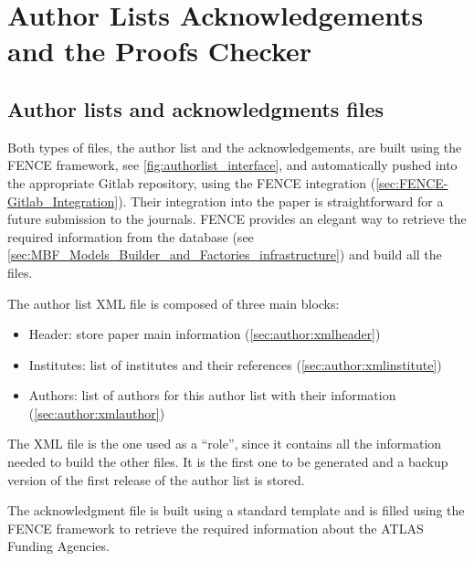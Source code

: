 
\section{Author Lists Acknowledgements and the Proofs Checker}%
\label{sec:Authorlists_Acknowledgements_and_ProofChecker}

\subsection{Author lists and acknowledgments files}%
\label{sec:Author_lists_and_acknowledgments_files}

Both types of files, the author list and the acknowledgements, are built using the FENCE framework, see \cref{fig:authorlist_interface},
and automatically pushed into the appropriate Gitlab repository, using the FENCE \gitlab integration (\cref{sec:FENCE-Gitlab_Integration}).
Their integration into the paper is straightforward for a future submission to the journals.
FENCE provides an elegant way to retrieve the required information from the database (see \cref{sec:MBF_Models_Builder_and_Factories_infrastructure}) and build all the files.
 
The author list XML file is composed of three main blocks:
\begin{itemize}
\item Header: store paper main information (\cref{sec:author:xmlheader})
\item Institutes: list of institutes and their references (\cref{sec:author:xmlinstitute})
\item Authors: list of authors for this author list with their information (\cref{sec:author:xmlauthor})
\end{itemize}
 
The XML file is the one used as a \enquote{role}, since it contains all the information needed to build the other files.
It is the first one to be generated and a backup version of the first release of the author list is stored.
 
The acknowledgment  file is built using a standard template and is filled using the FENCE framework to retrieve the required information about the ATLAS Funding Agencies.

